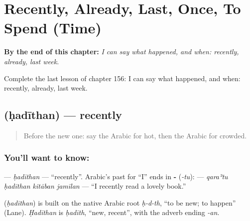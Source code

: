 
\chapter{Recently, Already, Last, Once, To Spend (Time)}
\label{ch:ar-recently-already-last-once-to-spend-time}

\begin{chapteropening}
\textbf{By the end of this chapter:} \emph{I can say what happened, and when: recently, already, last week.}

Complete the last lesson of chapter 156: I can say what happened, and when: recently, already, last week.
\end{chapteropening}

\section[\texorpdfstring{\ar{حديثا} (ḥadīthan)}{حديثا (ḥadīthan)}]{ (ḥadīthan) — recently}

\label{lesson:AR-C156-hadithan}



\begin{quote}
Before the new one: say the Arabic for hot, then the Arabic for crowded.
\end{quote}

\subsection*{You'll want to know: }
\textbf{} — \emph{ḥadīthan} — \textquotedblleft{}recently\textquotedblright{}. Arabic's past for \textquotedblleft{}I\textquotedblright{} ends in \textbf{-} (\emph{-tu}): \textbf{   } — \emph{qaraʾtu ḥadīthan kitāban jamīlan} — \textquotedblleft{}I recently read a lovely book.\textquotedblright{}

\begin{cousinweb}
\textbf{} (\emph{ḥadīthan}) is built on the native Arabic root \emph{ḥ-d-th}, \textquotedblleft{}to be new; to happen\textquotedblright{} (Lane). \emph{Ḥadīthan} is \emph{ḥadīth}, \textquotedblleft{}new, recent\textquotedblright{}, with the adverb ending \emph{-an}.
\end{cousinweb}

